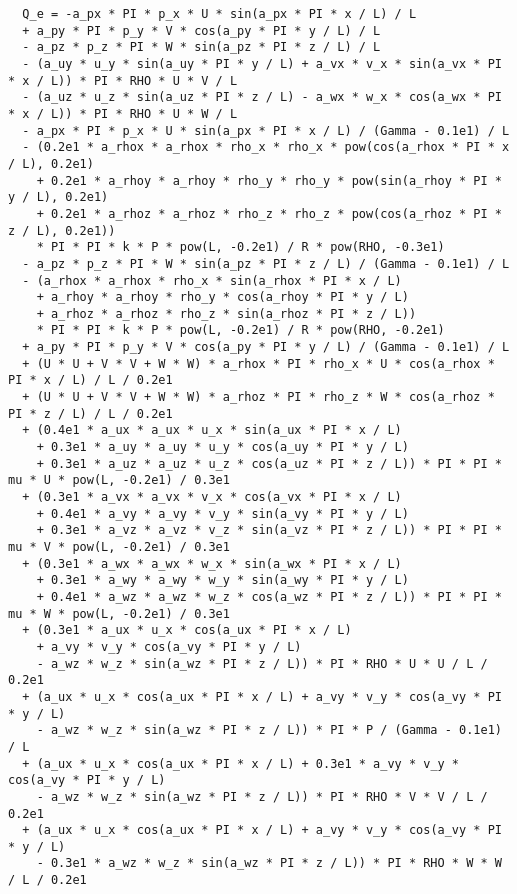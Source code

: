\documentclass[10pt]{article}
\begin{document}
\begin{small}
\begin{verbatim}
  Q_e = -a_px * PI * p_x * U * sin(a_px * PI * x / L) / L
  + a_py * PI * p_y * V * cos(a_py * PI * y / L) / L
  - a_pz * p_z * PI * W * sin(a_pz * PI * z / L) / L
  - (a_uy * u_y * sin(a_uy * PI * y / L) + a_vx * v_x * sin(a_vx * PI * x / L)) * PI * RHO * U * V / L
  - (a_uz * u_z * sin(a_uz * PI * z / L) - a_wx * w_x * cos(a_wx * PI * x / L)) * PI * RHO * U * W / L
  - a_px * PI * p_x * U * sin(a_px * PI * x / L) / (Gamma - 0.1e1) / L
  - (0.2e1 * a_rhox * a_rhox * rho_x * rho_x * pow(cos(a_rhox * PI * x / L), 0.2e1)
    + 0.2e1 * a_rhoy * a_rhoy * rho_y * rho_y * pow(sin(a_rhoy * PI * y / L), 0.2e1)
    + 0.2e1 * a_rhoz * a_rhoz * rho_z * rho_z * pow(cos(a_rhoz * PI * z / L), 0.2e1))
    * PI * PI * k * P * pow(L, -0.2e1) / R * pow(RHO, -0.3e1)
  - a_pz * p_z * PI * W * sin(a_pz * PI * z / L) / (Gamma - 0.1e1) / L
  - (a_rhox * a_rhox * rho_x * sin(a_rhox * PI * x / L)
    + a_rhoy * a_rhoy * rho_y * cos(a_rhoy * PI * y / L)
    + a_rhoz * a_rhoz * rho_z * sin(a_rhoz * PI * z / L))
    * PI * PI * k * P * pow(L, -0.2e1) / R * pow(RHO, -0.2e1)
  + a_py * PI * p_y * V * cos(a_py * PI * y / L) / (Gamma - 0.1e1) / L
  + (U * U + V * V + W * W) * a_rhox * PI * rho_x * U * cos(a_rhox * PI * x / L) / L / 0.2e1
  + (U * U + V * V + W * W) * a_rhoz * PI * rho_z * W * cos(a_rhoz * PI * z / L) / L / 0.2e1
  + (0.4e1 * a_ux * a_ux * u_x * sin(a_ux * PI * x / L)
    + 0.3e1 * a_uy * a_uy * u_y * cos(a_uy * PI * y / L)
    + 0.3e1 * a_uz * a_uz * u_z * cos(a_uz * PI * z / L)) * PI * PI * mu * U * pow(L, -0.2e1) / 0.3e1
  + (0.3e1 * a_vx * a_vx * v_x * cos(a_vx * PI * x / L)
    + 0.4e1 * a_vy * a_vy * v_y * sin(a_vy * PI * y / L)
    + 0.3e1 * a_vz * a_vz * v_z * sin(a_vz * PI * z / L)) * PI * PI * mu * V * pow(L, -0.2e1) / 0.3e1
  + (0.3e1 * a_wx * a_wx * w_x * sin(a_wx * PI * x / L)
    + 0.3e1 * a_wy * a_wy * w_y * sin(a_wy * PI * y / L)
    + 0.4e1 * a_wz * a_wz * w_z * cos(a_wz * PI * z / L)) * PI * PI * mu * W * pow(L, -0.2e1) / 0.3e1
  + (0.3e1 * a_ux * u_x * cos(a_ux * PI * x / L)
    + a_vy * v_y * cos(a_vy * PI * y / L)
    - a_wz * w_z * sin(a_wz * PI * z / L)) * PI * RHO * U * U / L / 0.2e1
  + (a_ux * u_x * cos(a_ux * PI * x / L) + a_vy * v_y * cos(a_vy * PI * y / L)
    - a_wz * w_z * sin(a_wz * PI * z / L)) * PI * P / (Gamma - 0.1e1) / L
  + (a_ux * u_x * cos(a_ux * PI * x / L) + 0.3e1 * a_vy * v_y * cos(a_vy * PI * y / L)
    - a_wz * w_z * sin(a_wz * PI * z / L)) * PI * RHO * V * V / L / 0.2e1
  + (a_ux * u_x * cos(a_ux * PI * x / L) + a_vy * v_y * cos(a_vy * PI * y / L)
    - 0.3e1 * a_wz * w_z * sin(a_wz * PI * z / L)) * PI * RHO * W * W / L / 0.2e1

\end{verbatim}
\end{small}
\end{document}
